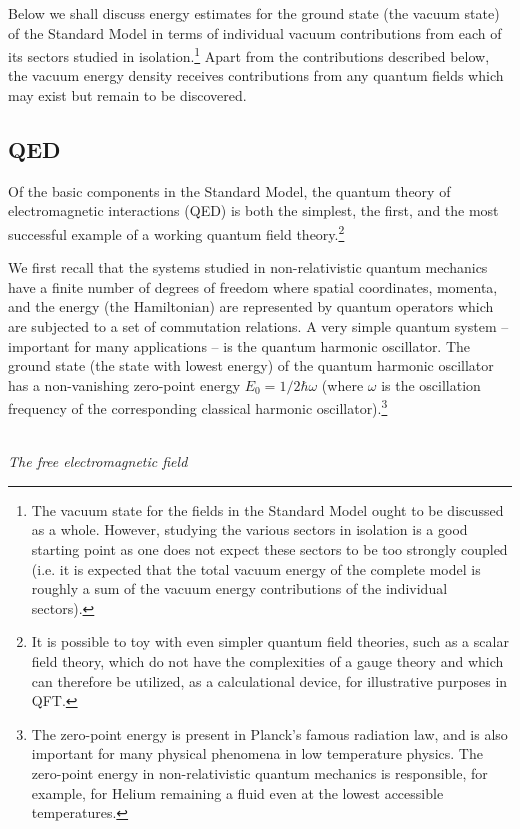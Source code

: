 \documentclass[12pt]{article}
\def\ss{\subsection}
\begin{document}
Below we shall discuss energy estimates for the ground state (the
vacuum state) of the Standard Model in terms of individual vacuum
contributions from each of its sectors studied in
isolation.\footnote{The vacuum state for the fields in the
Standard Model ought to be discussed as a whole. However, studying
the various sectors in isolation is a good starting point as one
does not expect these sectors to be too strongly coupled (i.e. it
is expected that the total vacuum energy of the complete model is
roughly a sum of the vacuum energy contributions of the individual
sectors).} Apart from the contributions described
below, the vacuum energy density receives contributions from any
quantum fields which may exist but remain to be discovered.

\ss{QED}
Of the basic components in the Standard Model, the quantum theory
of electromagnetic interactions (QED) is both the simplest, the
first, and the most successful example of a working quantum field
theory.\footnote{It is possible to toy with even simpler quantum
field theories, such as a scalar field theory, which do not have
the complexities of a gauge theory and which can therefore be
utilized, as a calculational device, for illustrative purposes in
QFT.} 

We first recall that the systems studied in non-relativistic
quantum mechanics have a finite number of degrees of freedom where
spatial coordinates, momenta, and the energy (the Hamiltonian) are
represented by quantum operators which are subjected to a set of
commutation relations. A very simple quantum system -- important
for many applications -- is the quantum harmonic oscillator. The
ground state (the state with lowest energy) of the quantum
harmonic oscillator has a non-vanishing zero-point energy $E_0 =
1/2 \hbar \omega$ (where $\omega$ is the oscillation frequency of
the corresponding classical harmonic oscillator).\footnote{The
zero-point energy is present in Planck's famous radiation law, and
is also important for many physical phenomena in low temperature
physics. The zero-point energy in non-relativistic quantum
mechanics is responsible, for example, for Helium remaining a
fluid even at the lowest accessible temperatures.}

\ \\
{\em The free electromagnetic field}
\end{document}

